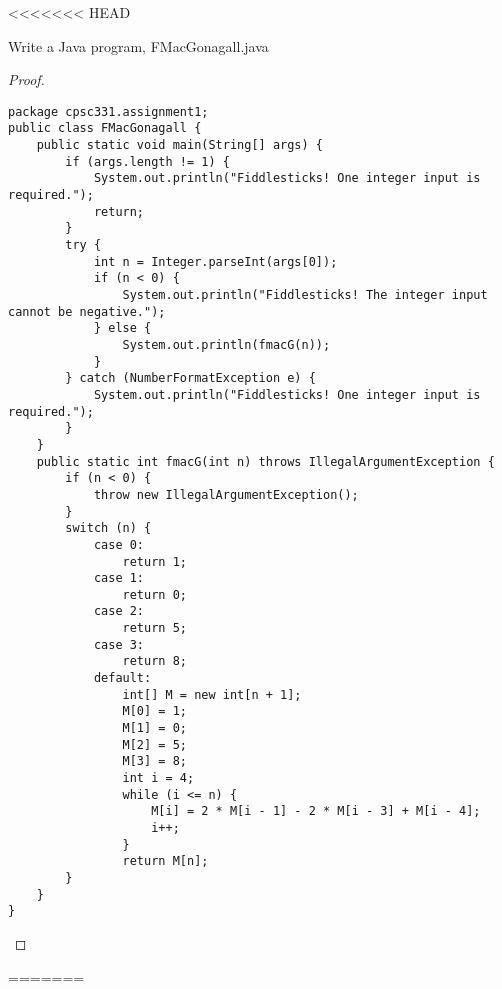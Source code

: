 \documentclass[12pt]{article}
\newenvironment{problem}[2][Problem]{\begin{trivlist}
\item[\hskip \labelsep {\bfseries #1}\hskip \labelsep {\bfseries #2.}]}{\end{trivlist}}
\begin{document}
<<<<<<< HEAD
\begin{problem}{13}
 Write a Java program, FMacGonagall.java
\end{problem}
\begin{proof}
$\:$
\begin{Verbatim}[fontsize=\small]
package cpsc331.assignment1;
public class FMacGonagall {
    public static void main(String[] args) {
        if (args.length != 1) {
            System.out.println("Fiddlesticks! One integer input is required.");
            return;
        }
        try {
            int n = Integer.parseInt(args[0]);
            if (n < 0) {
                System.out.println("Fiddlesticks! The integer input cannot be negative.");
            } else {
                System.out.println(fmacG(n));
            }
        } catch (NumberFormatException e) {
            System.out.println("Fiddlesticks! One integer input is required.");
        }
    }
    public static int fmacG(int n) throws IllegalArgumentException {
        if (n < 0) {
            throw new IllegalArgumentException();
        }
        switch (n) {
            case 0:
                return 1;
            case 1:
                return 0;
            case 2:
                return 5;
            case 3:
                return 8;
            default:
                int[] M = new int[n + 1];
                M[0] = 1;
                M[1] = 0;
                M[2] = 5;
                M[3] = 8;
                int i = 4;
                while (i <= n) {
                    M[i] = 2 * M[i - 1] - 2 * M[i - 3] + M[i - 4];
                    i++;
                }
                return M[n];
        }
    }
}
\end{Verbatim}
\end{proof}
=======
\end{document}
